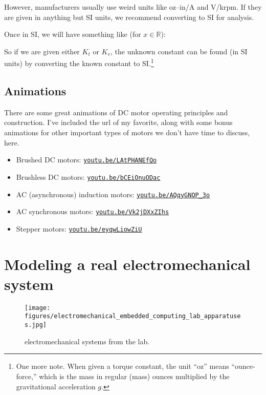 \documentclass[dynamic_systems.tex]{subfiles}
\begin{document}
However, manufacturers usually use weird units like oz--in/A and V/krpm.
If they are given in anything but SI units, we recommend converting to SI for analysis.
\tags{}

Once in SI, we will have something like (for $x\in\mathbb{R}$):

So if we are given either $K_t$ or $K_v$, the unknown constant can be found (in SI units) by converting the known constant to SI.\footnote{One more note. When given a torque constant, the unit ``oz'' means ``ounce-force,'' which is the mass in regular (mass) ounces multiplied by the gravitational acceleration $g$.}

\subsection{Animations}
\tags{}

There are some great animations of DC motor operating principles and construction.
I've included the url of my favorite, along with some bonus animations for other important types of motors we don't have time to discuss, here.
\tags{}

\begin{itemize}
	\item Brushed DC motors: \href{https://youtu.be/LAtPHANEfQo}{\texttt{youtu.be/LAtPHANEfQo}}
	\item Brushless DC motors: \href{https://youtu.be/bCEiOnuODac}{\texttt{youtu.be/bCEiOnuODac}}
	\item AC (asynchronous) induction motors: \href{https://youtu.be/AQqyGNOP_3o}{\texttt{youtu.be/AQqyGNOP\_3o}}
	\item AC synchronous motors: \href{https://youtu.be/Vk2jDXxZIhs}{\texttt{youtu.be/Vk2jDXxZIhs}}
	\item Stepper motors: \href{https://youtu.be/eyqwLiowZiU}{\texttt{youtu.be/eyqwLiowZiU}}
\end{itemize}


\section[A real electromechanical system]{Modeling a real electromechanical system}
\tags{}
\label{lec:modeling_real_em_system}

\begingroup
\setlength\intextsep{0pt}
\begin{wrapfigure}[13]{r}{0.5\textwidth}
  \centering
  \texttt{[image: figures/electromechanical\_embedded\_computing\_lab\_apparatuses.jpg]}
  \caption{\label{fig:lab_electromechanical_stations} electromechanical systems from the lab.}%
\end{wrapfigure}
\end{document}
